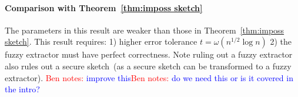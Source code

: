 \documentclass[11pt]{article}
\newcommand{\thref}[1]{\mbox{Theorem~\ref{#1}}}
\newcommand{\consref}[1]{\mbox{Construction~\ref{#1}}}
\newcommand{\Hoo}{\mathrm{H}_\infty}
\newcommand{\Hfuzz}{\mathrm{H}^{\mathtt{fuzz}}_{t,\infty}}
\newcommand{\authnote}[2]{{\textcolor{red}{\textsf{#1 notes: }\textcolor{blue}{ #2}}\marginpar{\textcolor{red}{\textbf{!!!!!}}}}}
\newcommand{\authnote}[2]{}
\newcommand{\bnote}[1]{{\authnote{Ben}{#1}}}
\begin{document}
\paragraph{Comparison with \thref{thm:imposs sketch}} The parameters in this result are weaker than those in \thref{thm:imposs sketch}.  This result requires: 1) higher error tolerance $t= \omega(n^{1/2}\log n)$ 2) the fuzzy extractor must have perfect correctness.  Note ruling out a fuzzy extractor also rules out a secure sketch~(as a secure sketch can be transformed to a fuzzy extractor).  
\bnote{improve this}\bnote{do we need this or is it covered in the intro?}



\appendix

%
%
\end{document}
